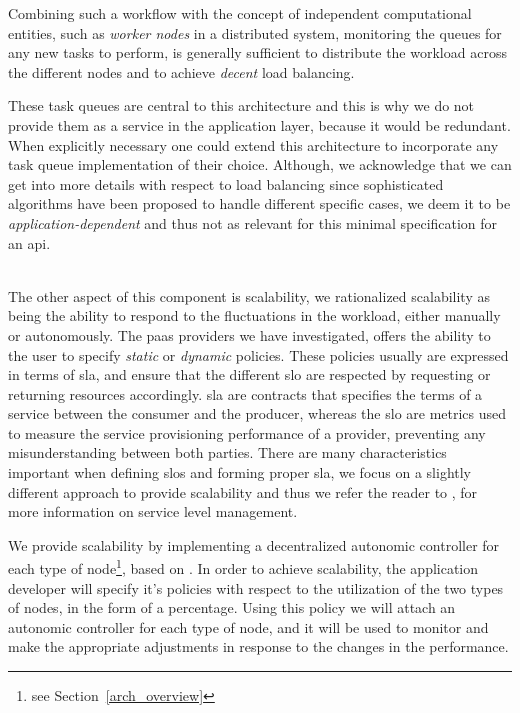 \documentclass[12pt, titlepage]{uo_temp}
\begin{document}
     Combining such a workflow with the concept of independent computational entities,
     such as \emph{worker nodes} in a distributed system, monitoring the queues for
     any new tasks to perform, is generally sufficient to distribute the workload across
     the different nodes and to achieve \emph{decent} load balancing.

     These task queues are central to this architecture and this is why we do not provide
     them as a service in the application layer, because it would be redundant. When
     explicitly necessary one could extend this architecture to incorporate any task queue
     implementation of their choice. Although, we acknowledge that we can get into more
     details with respect to load balancing since sophisticated algorithms have been
     proposed to handle different specific cases, we deem it to be
     \emph{application-dependent} and thus not as relevant for this minimal specification
     for an \gls{api}.

     
     \\ The other aspect of this component is scalability, we rationalized scalability as
     being the ability to respond to the fluctuations in the workload, either manually or
     autonomously.  The \gls{paas} providers we have investigated, offers the ability to
     the user to specify \emph{static} or \emph{dynamic} policies. These policies usually
     are expressed in terms of \gls{sla}, and ensure that the different \gls{slo} are
     respected by requesting or returning resources accordingly. \gls{sla} are contracts
     that specifies the terms of a service between the consumer and the producer, whereas
     the \gls{slo} are metrics used to measure the service provisioning performance of a
     provider, preventing any misunderstanding between both parties. There are many
     characteristics important when defining \gls{slo}s and forming proper \gls{sla}, we
     focus on a slightly different approach to provide scalability and thus we refer the
     reader to \cite{keller2003wsla} \cite{sturm2000foundations}, for more information on
     service level management.

     We provide scalability by implementing a decentralized autonomic
     controller for each type of node\footnote{see Section~\ref{arch_overview}}, based on
     \cite{gergin2014decentralized}. In order to achieve scalability, the application
     developer will specify it's policies with respect to the utilization of the two types
     of nodes, in the form of a percentage. Using this policy we will attach an autonomic
     controller for each type of node, and it will be used to monitor and make the
     appropriate adjustments in response to the changes in the performance.
\end{document}
